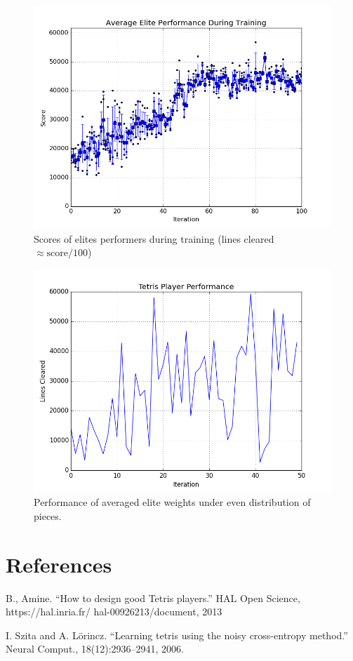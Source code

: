 \documentclass[12pt,letterpaper]{article}
\begin{document}
\begin{figure}[h!]
  \centering
  \includegraphics[width=0.7\linewidth]{training_scores.png}
  \caption{Scores of elites performers during training (lines cleared $\approx \text{score}/100$)}
\end{figure}

\begin{figure}[h!]
  \centering
  \includegraphics[width=0.7\linewidth]{performance.png}
  \caption{Performance of averaged elite weights under even distribution of pieces.}
\end{figure}

\newpage

\section{References}

\begin{enumerate}[label={[\arabic*]}]
  \item B., Amine. “How to design good Tetris players.” HAL Open Science, https://hal.inria.fr/ hal-00926213/document, 2013

  \item I. Szita and A. Lörincz. “Learning tetris using the noisy cross-entropy method.” Neural Comput., 18(12):2936–2941, 2006.
\end{enumerate}
\end{document}
